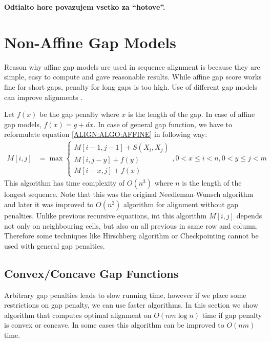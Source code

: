 \bigskip
{\large\bf Odtialto hore povazujem vsetko za ``hotove''. }
\bigskip



\section{Non-Affine Gap Models} 

Reason why affine gap models are used in sequence alignment is because they are
simple, easy to compute and gave reasonable results. While affine gap score
works fine for short gaps, penalty for long gaps is too high. Use of different 
gap models can improve alignments \cite{Gill2004,Cartwright2009}.

Let $f(x)$ be the gap penalty where $x$ is the length of the gap. In case of
affine gap models, $f(x)=g+dx$. In case of general gap function, we have to
reformulate equation \ref{ALIGN:ALGO:AFFINE} in following way:
\begin{align}
M[i,j] &= \max
\begin{cases}
 M[i-1,j-1]+S(X_i,X_j)\\
 M[i,j-y]+f(y)\\
 M[i-x,j]+f(x)
\end{cases}, 0<x\leq i<n,0<y\leq j<m
\end{align}
This algorithm has time complexity of $O(n^3)$ where $n$ is the length of the
longest sequence. Note that this was the original Needleman-Wunsch \cite{}
algorithm \cite{Needleman1970} and later it was improved to $O(n^2)$ algorithm
\cite{Sankoff1972} for alignment without gap penalties.
Unlike previous recursive equations, int this algorithm $M[i,j]$ depends not
only on neighbouring cells, but also on all previous in same row and column.
Therefore some techniques like Hirschberg algorithm or Checkpointing cannot be
used with general gap penalties.

\subsection{Convex/Concave Gap Functions}

Arbitrary gap penalties leads to slow running time, however if we place some
restrictions on gap penalty, we can use faster algorithms. In this section we
show algorithm that computes optimal alignment on $O(nm\log n)$ time if gap
penalty is convex or concave. In some cases this algorithm can be improved to
$O(nm)$ time.

\cite{Miller1988,GusfieldBook,Galil1989}

